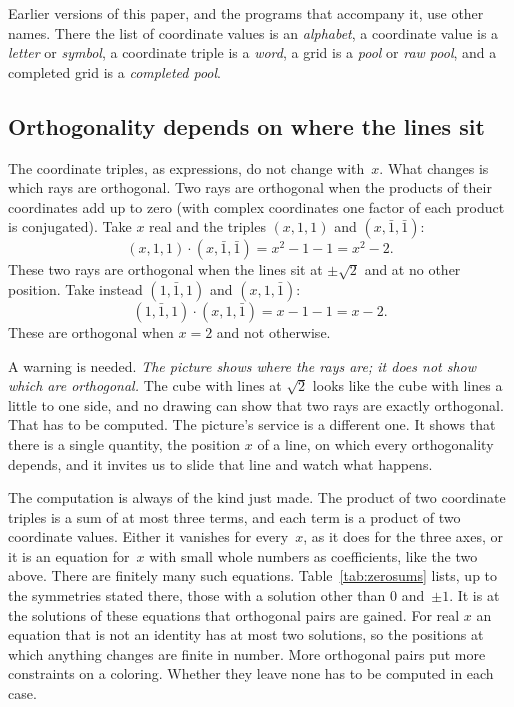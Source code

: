 Earlier versions of this paper, and the programs that accompany it, use other names.  There
the list of coordinate values is an \emph{alphabet}, a coordinate value is a \emph{letter} or
\emph{symbol}, a coordinate triple is a \emph{word}, a grid is a \emph{pool} or \emph{raw
pool}, and a completed grid is a \emph{completed pool}.

\subsection{Orthogonality depends on where the lines sit}

The coordinate triples, as expressions, do not change with~$x$.  What changes is which rays
are orthogonal.
Two rays are orthogonal when the products of their coordinates add up to zero (with complex
coordinates one factor of each product is conjugated).  Take $x$ real and the triples
$(x,1,1)$ and $(x,\bar1,\bar1)$:
\[
(x,1,1)\cdot(x,\bar1,\bar1)=x^2-1-1=x^2-2 .
\]
These two rays are orthogonal when the lines sit at $\pm\sqrt2$ and at no other position.
Take instead $(1,\bar1,1)$ and $(x,1,\bar1)$:
\[
(1,\bar1,1)\cdot(x,1,\bar1)=x-1-1=x-2 .
\]
These are orthogonal when $x=2$ and not otherwise.

A warning is needed.  \emph{The picture shows where the rays are; it does not show which are
orthogonal.}  The cube with lines at $\sqrt2$ looks like the cube with lines a little to one
side, and no drawing can show that two rays are exactly orthogonal.  That has to be computed.
The picture's service is a different one.  It shows that there is a single quantity, the
position $x$ of a line, on which every orthogonality depends, and it invites us to slide that
line and watch what happens.

The computation is always of the kind just made.  The product of two coordinate triples is a
sum of at most three terms, and each term is a product of two coordinate values.  Either it
vanishes for every~$x$, as it does for the three axes, or it is an equation for~$x$ with small
whole numbers as coefficients, like the two above.  There are finitely many such equations.
Table~\ref{tab:zerosums} lists, up to the symmetries stated there, those with a solution other
than $0$ and~$\pm1$.  It is at the solutions of these equations that orthogonal pairs are
gained.  For real $x$ an equation that is not an identity has at most two solutions, so the
positions at which anything changes are finite in number.  More orthogonal pairs put more
constraints on a coloring.  Whether they leave none has to be computed in each case.


